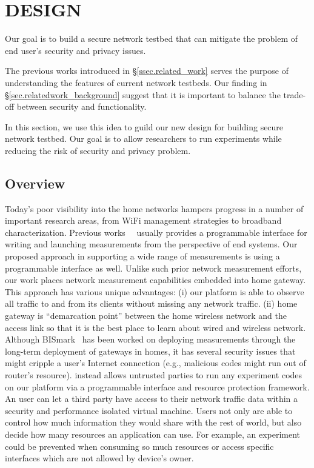 \chapter{\sysname DESIGN}
\label{sec.design}
Our goal is to build a secure network testbed that can mitigate the problem 
of end user's security and privacy issues. 

The previous works introduced in \S{\ref{ssec.related_work}} serves the purpose of understanding the features of current network testbeds. Our finding in \S{\ref{sec.relatedwork_background}} suggest that it is important to balance the trade-off between security and functionality.

In this section, we use this idea to guild our new design for building secure network testbed. Our goal is to allow researchers to run experiments while reducing the risk of security and privacy problem.

\section{Overview}
Today's poor visibility into the home networks hampers progress in a number of important research areas, from WiFi management strategies to broadband characterization. Previous works~\cite{sanchez2014measurement}~\cite{dhawan2012fathom} usually provides a programmable interface for writing and launching measurements from the perspective of end systems. Our proposed approach in supporting a wide range of measurements is using a programmable interface as well. Unlike such prior network measurement efforts, our work places network measurement capabilities embedded into home gateway. This approach has various unique advantages: (i) our platform is able to observe all traffic to and from its clients without missing any network traffic. (ii) home gateway is ``demarcation point'' between the home wireless network and the access link so that it is the best place to learn about wired and wireless network. Although BISmark~\cite{183951} has been worked on deploying measurements through the long-term deployment of gateways in homes, it has several security issues that might cripple a user's Internet connection (e.g., malicious codes might run out of router's resource). \sysname instead allows untrusted parties to run any experiment codes on our platform via a programmable interface and resource protection framework. An user can let a third party have access to their network traffic data within a security and performance isolated virtual machine. Users not only are able to control how much information they would share with the rest of world, but also decide how many resources an application can use. For example, an experiment could be prevented when consuming so much resources or access specific interfaces which are not allowed by device's owner. 


